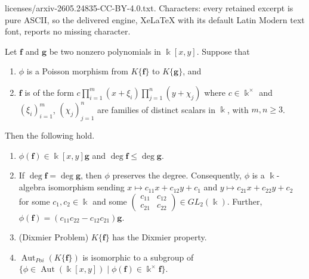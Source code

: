 \documentclass[10pt,a4paper]{amsart}
\DeclareMathOperator{\Aut}{Aut}
\newcommand \bff {{\mathbf{f}}}
\newcommand \bfg {{\mathbf{g}}}
\newcommand \kx {\Bbbk^\times}
\begin{document}
licenses/arxiv-2605.24835-CC-BY-4.0.txt. Characters: every retained excerpt is pure ASCII, so the delivered engine, XeLaTeX with its default Latin Modern text font, reports no missing character.
\begin{proposition}
\label{zzpro7.3}
Let $\bff$ and $\bfg$ be two nonzero polynomials in $\Bbbk[x,y]$. Suppose that
\begin{enumerate}
\item[(a)]
$\phi$ is a Poisson morphism from $K\{\bff\}$ to $K\{\bfg\}$, and
\item[(b)]
$\bff$ is of the form 
$c\prod_{i=1}^m (x+\xi_i) \prod_{j=1}^{n} (y+\chi_j)$
where $c \in \kx$ and $(\xi_i)_{i=1}^{m}$, $(\chi_j)_{j=1}^n$ 
are families of distinct scalars in $\Bbbk$, with $m,n\ge3$.
\end{enumerate}
Then the following hold.
\begin{enumerate}
\item[(1)]
$\phi(\bff) \in \Bbbk[x,y] \bfg$ and $\deg \bff\leq \deg \bfg$.  
\item[(2)]
If $\deg \bff=\deg \bfg$, then  $\phi$ preserves the degree.
Consequently, $\phi$ is a $\Bbbk$-algebra isomorphism sending 
$x\mapsto c_{11}x+c_{12}y+c_1$ and $y\mapsto c_{21}x+c_{22}y+c_2$ 
for some $c_1,c_2\in \Bbbk$ and some $\begin{pmatrix} c_{11}&c_{12}\\
c_{21}&c_{22}\end{pmatrix} \in GL_2(\Bbbk)$. Further, $\phi(\bff) = (c_{11}c_{22} - c_{12}c_{21}) \bfg$.
\item[(3)]{\rm{(Dixmier Problem)}}
$K\{\bff\}$ has the Dixmier property.
\item[(4)]
$\Aut_{Poi}(K\{\bff\})$ is isomorphic to a subgroup of $\{\phi\in \Aut(\Bbbk[x,y])
\mid \phi(\bff) \in \kx \bff\}.$
\end{enumerate}
\end{proposition}
\end{document}
